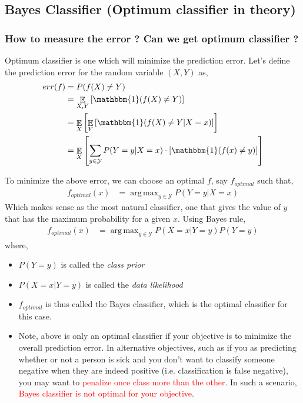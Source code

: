 \documentclass{article}
\DeclareMathOperator*{\argmax}{arg\,max}
\DeclareMathOperator*{\E}{\mathop{\mathbb{E}}}
\newcommand{\red}[1]{\textcolor{red}{#1}}
\newcommand{\mcaly}{\mathcal{Y}}
\begin{document}

\subsection{Bayes Classifier (Optimum classifier in theory)}

\subsubsection{How to measure the error ? Can we get optimum classifier ?}
Optimum classifier is one which will minimize the prediction error. Let's define the prediction error for the random variable $(X,Y)$ as,
\begin{align*}
    err(f) &= P(f(X) \neq Y)\\
    &= \E_{X,Y}\left[\mathbbm{1} (f(X) \neq Y) \right]\\
    &= \E_{X}\left[ \E_{Y} \left[ \mathbbm{1} (f(X) \neq Y \vert X=x) \right] \right]\\
    &= \E_{X}\left[ \sum_{y \in \mcaly} P(Y=y \vert X=x) \cdot \left [\mathbbm{1} (f(x) \neq y) \right] \right]\\
\end{align*}

To minimize the above error, we can choose an optimal $f$, say $f_{optimal}$ such that,
\begin{align*}
    f_{optimal}(x) &= \argmax_{y \in \mcaly} P(Y = y \vert X = x)
\end{align*}
Which makes sense as the most natural classifier, one that gives the value of $y$ that has the maximum probability for a given $x$. Using Bayes rule,
\begin{align*}
    f_{optimal}(x) &= \argmax_{y \in \mcaly} P(X = x | Y = y) P(Y = y)
\end{align*}
where,
\begin{itemize}
    \item $P(Y=y)$ is called the \textit{class prior}
    \item $P(X=x|Y=y)$ is called the \textit{data likelihood}
    \item $f_{optimal}$ is thus called the Bayes classifier, which is the optimal classifier for this case.
    \item Note, above is only an optimal classifier if your objective is to minimize the overall prediction error. In alternative objectives, such as if you as predicting whether or not a person is sick and you don't want to classify someone negative when they are indeed positive (i.e. classification is false negative), you may want to \red{penalize once class more than the other}. In such a scenario, \red{Bayes classifier is not optimal for your objective}.
\end{itemize}
\end{document}
